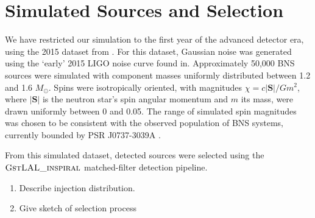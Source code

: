 \section{Simulated Sources and Selection}

We have restricted our simulation to the first year of the advanced detector era, using the 2015 dataset from \cite{Singer_2014}.  For this dataset, Gaussian noise was generated using the `early' 2015 LIGO noise curve found in\cite{Barsotti:2012}.  Approximately 50,000 BNS sources were simulated with component masses uniformly distributed between 1.2 and 1.6 $M_\odot$.  Spins were isotropically oriented, with magnitudes $\chi = c |\mathbf{S}|/G m^2$, where $|\mathbf{S}|$ is the neutron star's spin angular momentum and $m$ its mass, were drawn uniformly between 0 and 0.05.  The range of simulated spin magnitudes was chosen to be consistent with the observed population of BNS systems, currently bounded by PSR J0737-3039A \cite{Burgay_2003,Brown_2012}.

From this simulated dataset, detected sources were selected using the $\textsc{GstLAL\_inspiral}$ matched-filter detection pipeline\cite{Cannon_2012}. 

\begin{enumerate}
\item Describe injection distribution.
\item Give sketch of selection process
\end{enumerate}
